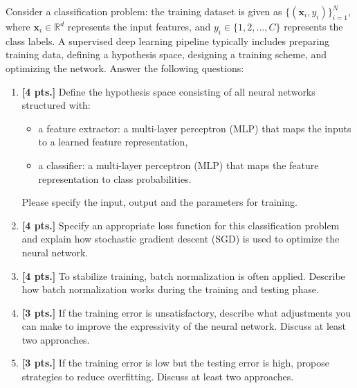 \documentclass[11pt,a4paper]{article}
\newcommand{\examstatement}[1]{%
  \par\addvspace{0.85em}%
  \noindent{\bfseries #1}\par\nobreak\addvspace{0.28em}%
}
\theoremstyle{definition}
\begin{document}
\examstatement{Problem 1. [18 pts.]}
Consider a classification problem: the training dataset is given as $\{(\mathbf{x}_i, y_i)\}_{i=1}^N$, where $\mathbf{x}_i \in \mathbb{R}^d$ represents the input features, and $y_i \in \{1, 2, \dots, C\}$ represents the class labels. A supervised deep learning pipeline typically includes preparing training data, defining a hypothesis space, designing a training scheme, and optimizing the network. Answer the following questions:
\begin{enumerate}[label=(\alph*)]
    \item \textbf{[4 pts.]} Define the hypothesis space consisting of all neural networks structured with:
    \begin{itemize}
        \item a feature extractor: a multi-layer perceptron (MLP) that maps the inputs to a learned feature representation,
        \item a classifier: a multi-layer perceptron (MLP) that maps the feature representation to class probabilities.
    \end{itemize}
    Please specify the input, output and the parameters for training.
    \item \textbf{[4 pts.]} Specify an appropriate loss function for this classification problem and explain how stochastic gradient descent (SGD) is used to optimize the neural network.
    \item \textbf{[4 pts.]} To stabilize training, batch normalization is often applied. Describe how batch normalization works during the training and testing phase.
    \item \textbf{[3 pts.]} If the training error is unsatisfactory, describe what adjustments you can make to improve the expressivity of the neural network. Discuss at least two approaches.
    \item \textbf{[3 pts.]} If the training error is low but the testing error is high, propose strategies to reduce overfitting. Discuss at least two approaches.
\end{enumerate}
\end{document}
